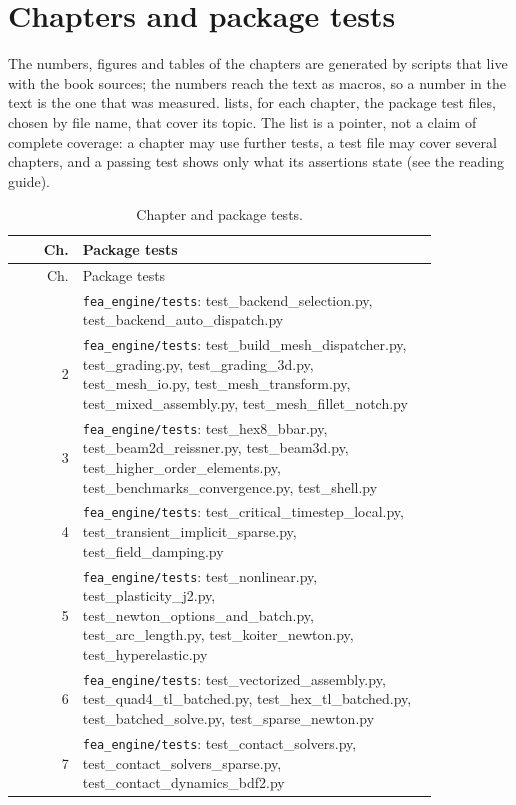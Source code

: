 \chapter{Chapters and package tests}\label{ch:map}

The numbers, figures and tables of the chapters are generated by scripts that live with the book sources; the numbers reach the text as macros, so a number in the text is the one that was measured.  lists, for each chapter, the package test files, chosen by file name, that cover its topic. The list is a pointer, not a claim of complete coverage: a chapter may use further tests, a test file may cover several chapters, and a passing test shows only what its assertions state (see the reading guide).

\begin{longtable}{@{}r >{\raggedright\arraybackslash}p{0.84\linewidth}@{}}
\caption{Chapter and package tests.}\label{tab:map}\\
\toprule
Ch. & Package tests \\
\midrule
\endfirsthead
\toprule
Ch. & Package tests \\
\midrule
\endhead
\bottomrule
\endfoot
1 & \texttt{fea\_engine/tests}: test\_backend\_selection.py, test\_backend\_auto\_dispatch.py \\
2 & \texttt{fea\_engine/tests}: test\_build\_mesh\_dispatcher.py, test\_grading.py, test\_grading\_3d.py, test\_mesh\_io.py, test\_mesh\_transform.py, test\_mixed\_assembly.py, test\_mesh\_fillet\_notch.py \\
3 & \texttt{fea\_engine/tests}: test\_hex8\_bbar.py, test\_beam2d\_reissner.py, test\_beam3d.py, test\_higher\_order\_elements.py, test\_benchmarks\_convergence.py, test\_shell.py \\
4 & \texttt{fea\_engine/tests}: test\_critical\_timestep\_local.py, test\_transient\_implicit\_sparse.py, test\_field\_damping.py \\
5 & \texttt{fea\_engine/tests}: test\_nonlinear.py, test\_plasticity\_j2.py, test\_newton\_options\_and\_batch.py, test\_arc\_length.py, test\_koiter\_newton.py, test\_hyperelastic.py \\
6 & \texttt{fea\_engine/tests}: test\_vectorized\_assembly.py, test\_quad4\_tl\_batched.py, test\_hex\_tl\_batched.py, test\_batched\_solve.py, test\_sparse\_newton.py \\
7 & \texttt{fea\_engine/tests}: test\_contact\_solvers.py, test\_contact\_solvers\_sparse.py, test\_contact\_dynamics\_bdf2.py \\

\end{longtable}
